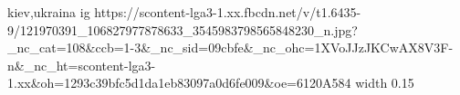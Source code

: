  
 
 
 
 

\par
kiev,ukraina
\ifcmt
  ig https://scontent-lga3-1.xx.fbcdn.net/v/t1.6435-9/121970391_106827977878633_3545983798565848230_n.jpg?_nc_cat=108&ccb=1-3&_nc_sid=09cbfe&_nc_ohc=1XVoJJzJKCwAX8V3F-n&_nc_ht=scontent-lga3-1.xx&oh=1293c39bfc5d1da1eb83097a0d6fe009&oe=6120A584
  width 0.15
\fi
